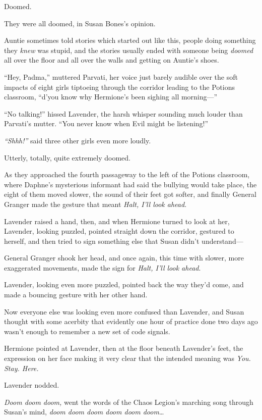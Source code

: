 Doomed.

They were all doomed, in Susan Bones's opinion.

Auntie sometimes told stories which started out like this, people doing
something they \emph{knew} was stupid, and the stories usually ended
with someone being \emph{doomed} all over the floor and all over the
walls and getting on Auntie's shoes.

``Hey, Padma,'' muttered Parvati, her voice just barely audible over the
soft impacts of eight girls tiptoeing through the corridor leading to
the Potions classroom, ``d'you know why Hermione's been sighing all
morning---''

``No talking!'' hissed Lavender, the harsh whisper sounding much louder
than Parvati's mutter. ``You never know when Evil might be listening!''

\emph{``Shhh!''} said three other girls even more loudly.

Utterly, totally, quite extremely doomed.

As they approached the fourth passageway to the left of the Potions
classroom, where Daphne's mysterious informant had said the bullying
would take place, the eight of them moved slower, the sound of their
feet got softer, and finally General Granger made the gesture that meant
\emph{Halt, I'll look ahead}.

Lavender raised a hand, then, and when Hermione turned to look at her,
Lavender, looking puzzled, pointed straight down the corridor, gestured
to herself, and then tried to sign something else that Susan didn't
understand---

General Granger shook her head, and once again, this time with slower,
more exaggerated movements, made the sign for \emph{Halt, I'll look
ahead}.

Lavender, looking even more puzzled, pointed back the way they'd come,
and made a bouncing gesture with her other hand.

Now everyone else was looking even more confused than Lavender, and
Susan thought with some acerbity that evidently one hour of practice
done two days ago wasn't enough to remember a new set of code signals.

Hermione pointed at Lavender, then at the floor beneath Lavender's feet,
the expression on her face making it very clear that the intended
meaning was \emph{You. Stay. Here.}

Lavender nodded.

\emph{Doom doom doom,} went the words of the Chaos Legion's marching
song through Susan's mind, \emph{doom doom doom doom doom doom}\ldots{}

